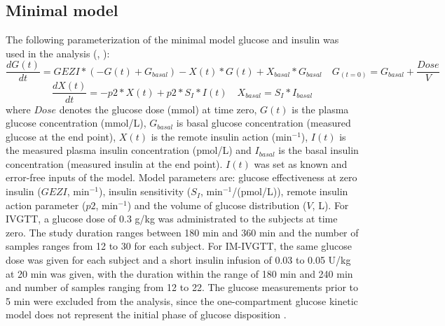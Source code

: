 \documentclass[utf8]{frontiersSCNS} %
\begin{document}
\subsection{Minimal model}
The following parameterization of the minimal model glucose and insulin was used in the analysis (\citet{Bergman1979}, \citet{Araujo-vilar1998}):
\begin{equation}
\frac{dG(t)}{dt} =GEZI*(-G(t)+G_{basal})-X(t)*G(t)+X_{basal}*G_{basal} \quad G_{(t=0)} =G_{basal}+\frac{Dose}{V}\label{eq:01}
\end{equation}
\begin{equation}
\frac{dX(t)}{dt} =-p2*X(t)+p2*S_I*I(t) \quad X_{basal} =S_I*I_{basal}\label{eq:02}
\end{equation}
where $Dose$ denotes the glucose dose (mmol) at time zero, $G(t)$ is the plasma glucose concentration (mmol/L), $G_{basal}$ is basal glucose concentration (measured glucose at the end point), $X(t)$ is the remote insulin action (min$^{-1}$), $I(t)$ is the measured plasma insulin concentration (pmol/L) and $I_{basal}$ is the basal insulin concentration (measured insulin at the end point). $I(t)$ was set as known and error-free inputs of the model. Model parameters are: glucose effectiveness at zero insulin ($GEZI$, min$^{-1}$), insulin sensitivity ($S_I$, min$^{-1}$/(pmol/L)), remote insulin action parameter ($p2$, min$^{-1}$) and the volume of glucose distribution ($V$, L). For IVGTT, a glucose dose of 0.3 g/kg was administrated to the subjects at time zero. The study duration ranges between 180 min and 360 min and the number of samples ranges from 12 to 30 for each subject. For IM-IVGTT, the same glucose dose was given for each subject and a short insulin infusion of 0.03 to 0.05 U/kg at 20 min was given, with the duration within the range of 180 min and 240 min and number of samples ranging from 12 to 22. The glucose measurements prior to 5 min were excluded from the analysis, since the one-compartment glucose kinetic model does not represent the initial phase of glucose disposition  \citep{Vicini1999}.
\end{document}
